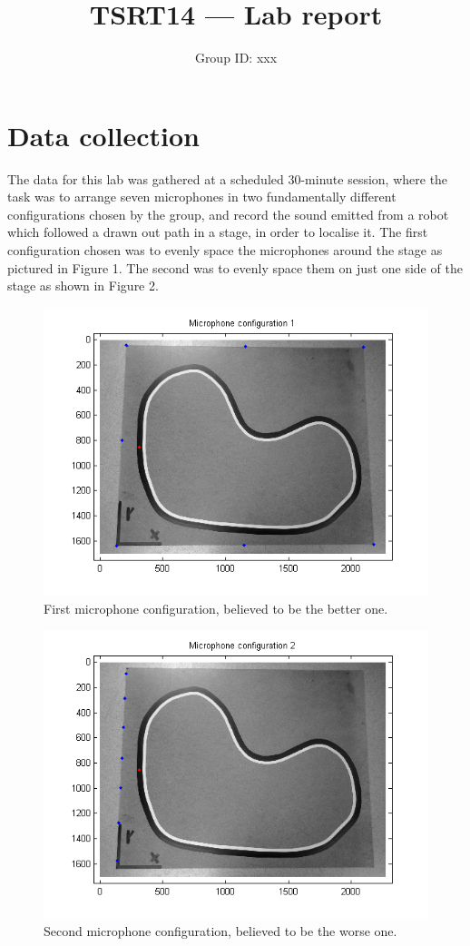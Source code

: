 \documentclass[11pt]{article}
\title{TSRT14 --- Lab report}
\author{Group ID: xxx}
\begin{document}
\maketitle
\section{Data collection}
The data for this lab was gathered at a scheduled 30-minute session, where the task was to arrange seven microphones in two fundamentally different configurations chosen by the group, and record the sound emitted from a robot which followed a drawn out path in a stage, in order to localise it. The first configuration chosen was to evenly space the microphones around the stage as pictured in Figure 1. The second was to evenly space them on just one side of the stage as shown in Figure 2.\\
\begin{figure}[h!]
\centering
\includegraphics[width=350pt]{microphone_configuration_1.png}
\caption{First microphone configuration, believed to be the better one.}
\end{figure}
\begin{figure}[h!]
\centering
\includegraphics[width=350pt]{microphone_configuration_2.png}
\caption{Second microphone configuration, believed to be the worse one.}
\end{figure}
\end{document}
